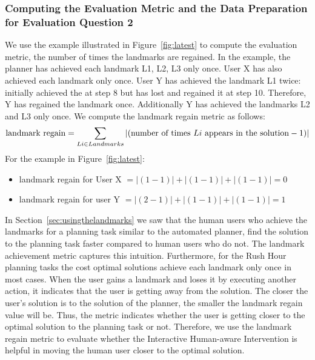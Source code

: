 \subsubsection{Computing the Evaluation Metric and the Data Preparation for Evaluation Question 2}
We use the example illustrated in Figure~\ref{fig:latest} to compute the evaluation metric, the number of times the landmarks are regained.
In the example, the planner has achieved each landmark L1, L2, L3 only once.
User X has also achieved each landmark only once.
User Y has achieved the landmark L1 twice: initially achieved the at step 8 but has lost and regained it at step 10.
Therefore, Y has regained the landmark once.
Additionally Y has achieved the landmarks L2 and L3 only once.
We compute the landmark regain metric as follows:
\begin{equation}
\textup{landmark regain} = \sum_{Li \in Landmarks} \left | (\textup{number of times } Li \textup{ appears in the solution} - 1) \right |
\end{equation}
For the example in Figure~\ref{fig:latest}:
\begin{itemize}
\item landmark regain for User X $= |(1-1)| + |(1-1)| + |(1-1)| = 0$
\item landmark regain for user Y $=|(2-1)| + |(1-1)| + |(1-1)| = 1$
\end{itemize}
In Section~\ref{sec:usingthelandmarks} we saw that the human users who achieve the landmarks for a planning task similar to the automated planner, find the solution to the planning task faster compared to human users who do not.
The landmark achievement metric captures this intuition.
Furthermore, for the Rush Hour planning tasks the cost optimal solutions achieve each landmark only once in most cases.
When the user gains a landmark and loses it by executing another action, it indicates that the user is getting away from the solution.
The closer the user's solution is to the solution of the planner, the smaller the landmark regain value will be.
Thus, the metric indicates whether the user is getting closer to the optimal solution to the planning task or not.
Therefore, we use the landmark regain metric to evaluate whether the Interactive Human-aware Intervention is helpful in moving the human user closer to the optimal solution.


